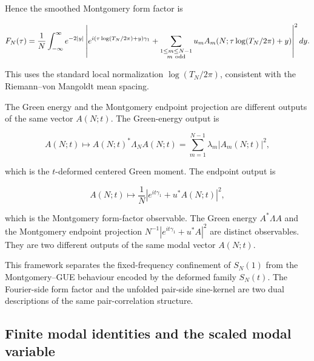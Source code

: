 \documentclass[11pt]{amsart}
\numberwithin{equation}{section}
\theoremstyle{plain}
\theoremstyle{definition}
\theoremstyle{remark}
\begin{document}
Hence the smoothed Montgomery form factor is

\begin{equation}
F_N(\tau)
=
\frac1N
\int_{-\infty}^{\infty}
e^{-2|y|}
\left|
e^{i(\tau\log(T_N/2\pi)+y)\gamma_1}
+
\sum_{\substack{1\le m\le N-1\\ m\ {\rm odd}}}
u_m A_m(N;\tau\log(T_N/2\pi)+y)
\right|^2dy.
\label{eq:deformed_endpoint_green_modal_smoothed_form_factor}
\end{equation}

This uses the standard local normalization \(\log(T_N/2\pi)\), consistent
with the Riemann--von Mangoldt mean spacing.

The Green energy and the Montgomery endpoint projection are different
outputs of the same vector \(A(N;t)\). The Green-energy output is

\begin{equation}
A(N;t)\longmapsto A(N;t)^*\Lambda_N A(N;t)
=
\sum_{m=1}^{N-1}\lambda_m |A_m(N;t)|^2,
\label{eq:green_energy_output_from_modal_vector}
\end{equation}

which is the \(t\)-deformed centered Green moment. The endpoint output is

\begin{equation}
A(N;t)\longmapsto
\frac1N
\left|
e^{it\gamma_1}+u^*A(N;t)
\right|^2,
\label{eq:montgomery_endpoint_output_from_modal_vector}
\end{equation}

which is the Montgomery form-factor observable. The Green energy
\(A^*\Lambda A\) and the Montgomery endpoint projection
\(N^{-1}|e^{it\gamma_1}+u^*A|^2\) are distinct observables. They are two
different outputs of the same modal vector \(A(N;t)\).

This framework separates the fixed-frequency confinement of \(S_N(1)\)
from the Montgomery--GUE behaviour encoded by the deformed family
\(S_N(t)\). The Fourier-side form factor and the unfolded pair-side
sine-kernel are two dual descriptions of the same pair-correlation
structure.

\subsection{Finite modal identities and the scaled modal variable}
\label{subsec:finite_modal_identities_scaled_modal_variable}
\end{document}

